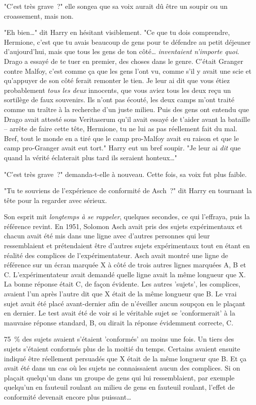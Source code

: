 "C'est très grave~?" elle songea que sa voix aurait dû être un soupir ou un croassement, mais non.

"Eh bien…" dit Harry en hésitant visiblement. "Ce que tu dois comprendre, Hermione, c'est que tu avais beaucoup de gens pour te défendre au petit déjeuner d'aujourd'hui, mais que tous les gens de ton côté… \emph{inventaient n'importe quoi}. Drago a essayé de te tuer en premier, des choses dans le genre. C'était Granger contre Malfoy, c'est comme ça que les gens l'ont vu, comme s'il y avait une scie et qu'appuyer de son côté ferait remonter le tien. Je leur ai dit que vous étiez probablement \emph{tous les deux} innocents, que vous aviez tous les deux reçu un sortilège de faux souvenirs. Ils n'ont pas écouté, les deux camps m'ont traité comme un traître à la recherche d'un juste milieu. Puis des gens ont entendu que Drago avait attesté sous Veritaserum qu'il avait essayé de t'aider avant la bataille -- arrête de faire cette tête, Hermione, tu ne lui as pas réellement fait du mal. Bref, tout le monde en a tiré que le camp pro-Malfoy avait eu raison et que le camp pro-Granger avait eut tort." Harry eut un bref soupir. "Je leur ai \emph{dit} que quand la vérité éclaterait plus tard ils seraient honteux…"

"C'est très grave~?" demanda-t-elle à nouveau. Cette fois, sa voix fut plus faible.

"Tu te souviens de l'expérience de conformité de Asch~?" dit Harry en tournant la tête pour la regarder avec sérieux.

Son esprit mit \emph{longtemps à se rappeler}, quelques secondes, ce qui l'effraya, puis la référence revint. En 1951, Solomon Asch avait pris des sujets expérimentaux et chacun avait été mis dans une ligne avec d'autres personnes qui leur ressemblaient et prétendaient être d'autres sujets expérimentaux tout en étant en réalité des complices de l'expérimentateur. Asch avait montré une ligne de référence sur un écran marquée X à côté de trois autres lignes marquées A, B et C. L'expérimentateur avait demandé quelle ligne avait la même longueur que X. La bonne réponse était C, de façon évidente. Les autres 'sujets', les complices, avaient l'un après l'autre dit que X était de la même longueur que B. Le vrai sujet avait été placé avant-dernier afin de n'éveiller aucun soupçon en le plaçant en dernier. Le test avait été de voir si le véritable sujet se 'conformerait' à la mauvaise réponse standard, B, ou dirait la réponse évidemment correcte, C.

75~\% des sujets avaient s'étaient 'conformés' au moins une fois. Un tiers des sujets s'étaient conformés plus de la moitié du temps. Certains avaient ensuite indiqué être réellement persuadés que X était de la même longueur que B. Et ça avait été dans un cas où les sujets ne connaissaient aucun des complices. Si on plaçait quelqu'un dans un groupe de gens qui lui ressemblaient, par exemple quelqu'un en fauteuil roulant au milieu de gens en fauteuil roulant, l'effet de conformité devenait encore plus puissant…

